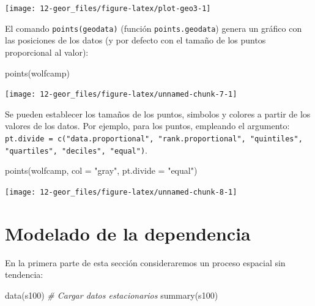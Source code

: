 \documentclass[
  spanish,
]{book}
\newenvironment{Shaded}{\begin{snugshade}}{\end{snugshade}}
\newcommand{\AttributeTok}[1]{\textcolor[rgb]{0.77,0.63,0.00}{#1}}
\newcommand{\CommentTok}[1]{\textcolor[rgb]{0.56,0.35,0.01}{\textit{#1}}}
\newcommand{\FunctionTok}[1]{\textcolor[rgb]{0.00,0.00,0.00}{#1}}
\newcommand{\NormalTok}[1]{#1}
\newcommand{\StringTok}[1]{\textcolor[rgb]{0.31,0.60,0.02}{#1}}
\theoremstyle{break}
\begin{document}
\begin{center}\texttt{[image: 12-geor\_files/figure-latex/plot-geo3-1]} \end{center}

El comando \texttt{points(geodata)} (función \texttt{points.geodata}) genera un gráfico con
las posiciones de los datos (y por defecto con el tamaño de los puntos proporcional
al valor):

\begin{Shaded}
\begin{Highlighting}[]
\FunctionTok{points}\NormalTok{(wolfcamp)}
\end{Highlighting}
\end{Shaded}

\begin{center}\texttt{[image: 12-geor\_files/figure-latex/unnamed-chunk-7-1]} \end{center}

Se pueden establecer los tamaños de los puntos, simbolos y colores a
partir de los valores de los datos. Por ejemplo, para los puntos, empleando el argumento:
\texttt{pt.divide\ =\ c("data.proportional",\ "rank.proportional",\ "quintiles",}
\texttt{"quartiles",\ "deciles",\ "equal")}.

\begin{Shaded}
\begin{Highlighting}[]
\FunctionTok{points}\NormalTok{(wolfcamp, }\AttributeTok{col =} \StringTok{"gray"}\NormalTok{, }\AttributeTok{pt.divide =} \StringTok{"equal"}\NormalTok{)}
\end{Highlighting}
\end{Shaded}

\begin{center}\texttt{[image: 12-geor\_files/figure-latex/unnamed-chunk-8-1]} \end{center}

\hypertarget{modelado-de-la-dependencia}{%
\section{Modelado de la dependencia}\label{modelado-de-la-dependencia}}

En la primera parte de esta sección consideraremos un proceso espacial sin
tendencia:

\begin{Shaded}
\begin{Highlighting}[]
\FunctionTok{data}\NormalTok{(s100) }\CommentTok{\# Cargar datos estacionarios}
\FunctionTok{summary}\NormalTok{(s100)}
\end{Highlighting}
\end{Shaded}
\end{document}
